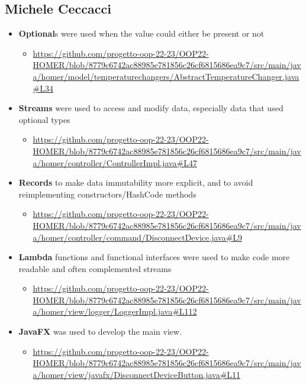 \subsection{Michele Ceccacci}
\begin{itemize}
	\item \textbf{Optional}s were used when the value could either be present or not
	\begin{itemize}
		\item \url{https://github.com/progetto-oop-22-23/OOP22-HOMER/blob/8779c6742ac88985e781856c26cf6815686ea9c7/src/main/java/homer/model/temperaturechangers/AbstractTemperatureChanger.java#L34}
	\end{itemize}
	\item \textbf{Streams} were used to access and modify data, especially data that used optional types
	\begin{itemize}
		\item \url{https://github.com/progetto-oop-22-23/OOP22-HOMER/blob/8779c6742ac88985e781856c26cf6815686ea9c7/src/main/java/homer/controller/ControllerImpl.java#L47}
	\end{itemize}
	\item \textbf{Records} to make data immutability more explicit, and to avoid reimplementing constructors/HashCode methods
	\begin{itemize}
		\item  \url{https://github.com/progetto-oop-22-23/OOP22-HOMER/blob/8779c6742ac88985e781856c26cf6815686ea9c7/src/main/java/homer/controller/command/DisconnectDevice.java#L9}
	\end{itemize}
	\item \textbf{Lambda} functions and functional interfaces were used to make code more readable and often complemented streams 
	\begin{itemize}
		\item \url{https://github.com/progetto-oop-22-23/OOP22-HOMER/blob/8779c6742ac88985e781856c26cf6815686ea9c7/src/main/java/homer/view/logger/LoggerImpl.java#L112}
	\end{itemize}
	\item \textbf{JavaFX} was used to develop the main view.
	\begin{itemize}
		\item \url{https://github.com/progetto-oop-22-23/OOP22-HOMER/blob/8779c6742ac88985e781856c26cf6815686ea9c7/src/main/java/homer/view/javafx/DisconnectDeviceButton.java#L11}
	\end{itemize}
\end{itemize}